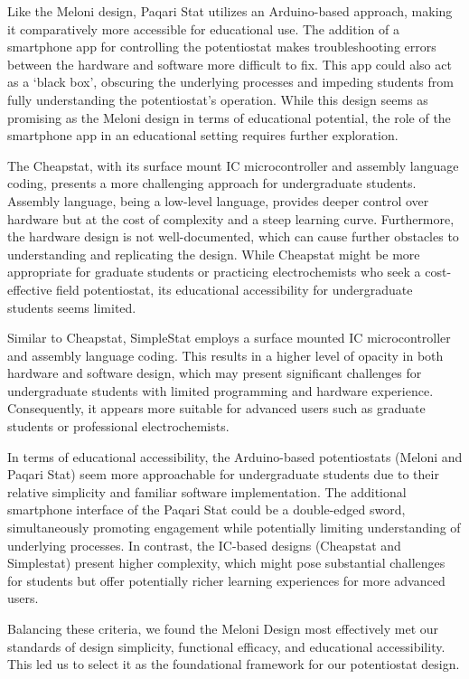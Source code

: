 \documentclass{article}
\begin{document}
Like the Meloni design, Paqari Stat utilizes an Arduino-based approach, making it comparatively more accessible for educational use. The addition of a smartphone app for controlling the potentiostat makes troubleshooting errors between the hardware and software more difficult to fix. This app could also act as a `black box', obscuring the underlying processes and impeding students from fully understanding the potentiostat's operation. While this design seems as promising as the Meloni design in terms of educational potential, the role of the smartphone app in an educational setting requires further exploration.

The Cheapstat, with its surface mount IC microcontroller and assembly language coding, presents a more challenging approach for undergraduate students. Assembly language, being a low-level language, provides deeper control over hardware but at the cost of complexity and a steep learning curve. Furthermore, the hardware design is not well-documented, which can cause further obstacles to understanding and replicating the design. While Cheapstat might be more appropriate for graduate students or practicing electrochemists who seek a cost-effective field potentiostat, its educational accessibility for undergraduate students seems limited.

Similar to Cheapstat, SimpleStat employs a surface mounted IC microcontroller and assembly language coding. This results in a higher level of opacity in both hardware and software design, which may present significant challenges for undergraduate students with limited programming and hardware experience. Consequently, it appears more suitable for advanced users such as graduate students or professional electrochemists.

In terms of educational accessibility, the Arduino-based potentiostats (Meloni and Paqari Stat) seem more approachable for undergraduate students due to their relative simplicity and familiar software implementation. The additional smartphone interface of the Paqari Stat could be a double-edged sword, simultaneously promoting engagement while potentially limiting understanding of underlying processes. In contrast, the IC-based designs (Cheapstat and Simplestat) present higher complexity, which might pose substantial challenges for students but offer potentially richer learning experiences for more advanced users.

Balancing these criteria, we found the Meloni Design most effectively met our standards of design simplicity, functional efficacy, and educational accessibility. This led us to select it as the foundational framework for our potentiostat design.
\end{document}
